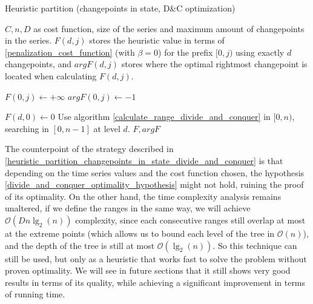 \documentclass[pdflatex,sn-mathphys]{sn-jnl}%
\theoremstyle{thmstyleone}%
\theoremstyle{thmstyletwo}%
\theoremstyle{thmstylethree}%
\begin{document}
\begin{algorithm}[H]
\caption{Heuristic partition (changepoints in state, D\&C optimization) }\label{heuristic_partition_changepoints_in_state_divide_and_conquer}
\begin{algorithmic}[1]
\Require $C, n, D$ as cost function, size of the series and maximum amount of changepoints in the series. 
\Ensure $F(d,j)$ stores the heuristic value in terms of \ref{penalization_cost_function} (with $\beta = 0$) for the prefix $[0,j)$ using exactly $d$ changepoints, and $argF(d,j)$ stores where the optimal rightmost changepoint is located when calculating $F(d,j)$. 

    \State $F(0,j) \leftarrow +\infty$
    \State $argF(0,j) \leftarrow -1$
    
\EndFor 


 
    \State $F(d,0) \leftarrow 0$ 
        \State Use algorithm \ref{calculate_range_divide_and_conquer} in $[0, n)$, searching in $[0, n-1]$ at level $d$.
\EndFor
\State \Return $F, argF$
\end{algorithmic}
\end{algorithm}




The counterpoint of the strategy described in \ref{heuristic_partition_changepoints_in_state_divide_and_conquer} is that depending on the time series values and the cost function chosen, the hypothesis \ref{divide_and_conquer_optimality_hypothesis} might not hold, ruining the proof of its optimality. On the other hand, the time complexity analysis remains unaltered, if we define the ranges in the same way, we will achieve $\mathcal{O}(Dn\lg_2(n))$ complexity, since each consecutive ranges still overlap at most at the extreme points (which allows us to bound each level of the tree in $\mathcal{O}(n)$), and the depth of the tree is still at most $\mathcal{O}(\lg_2(n))$. So this technique can still be used, but only as a heuristic that works fast to solve the problem without proven optimality. We will see in future sections that it still shows very good results in terms of its quality, while achieving a significant improvement in terms of running time.
\end{document}
